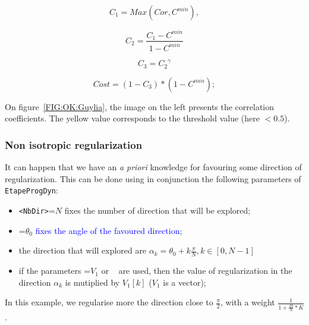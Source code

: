 \begin{equation}
    C_1=Max(Cor,C^{min}) ,
\end{equation}

\begin{equation}
   C_2 = \frac{C_1 -C^{min}}{1-C^{min}}
\end{equation}

\begin{equation}
   C_3 = {C_2} ^\gamma
\end{equation}

\begin{equation}
   Cost  = (1-C_3) * (1-C^{min});
\end{equation}

On figure~\ref{FIG:OK:Guylia}, the image on the left presents the correlation coefficients. The yellow value corresponds to the threshold value (here $<0.5$).


\subsubsection{Non isotropic regularization}

It can happen that we have an \emph{a priori} knowledge for favouring some direction of regularization.
This can be done using in conjunction the following parameters of {\tt EtapeProgDyn}:

\begin{itemize}
   \item  {\tt  <NbDir>}=$N$  fixes the number of direction that will be explored;
   \item  {\tt  <Teta0>}=$\theta_0$  \textcolor{blue}{fixes the angle of the favoured direction};
   \item  the direction that will explored are $\alpha_k=\theta_0 + k\frac{\pi}{N} , k\in[0,N-1]$
   \item if the parameters  {\tt <Px1MultRegul>}=$V_1$ or {\tt <Px2MultRegul> } are used, then the value
         of regularization in the direction  $\alpha_k$ is  mutiplied by $V_1[k]$ ($V_1$ is a vector);
\end{itemize}

In this example, we regularise more the direction close to $\frac{\pi}{2}$, with a weight
$\frac{1}{1+\frac{10}{N}*K}$.




